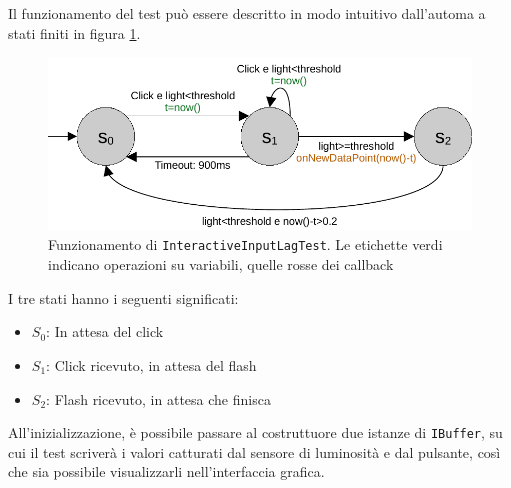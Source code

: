 Il funzionamento del test può essere descritto in modo intuitivo dall'automa a stati finiti in figura \ref{fig:interactiveInputLagTest_fsm}.

\begin{figure}[H]
	\centering
	\includegraphics[width=.8\textwidth]{Applicazione_files/interactiveInputLagTest_fsm.pdf}
	\caption{Funzionamento di \texttt{InteractiveInputLagTest}. Le etichette verdi indicano operazioni su variabili, quelle rosse dei callback}
	\label{fig:interactiveInputLagTest_fsm}
\end{figure}

I tre stati hanno i seguenti significati:\begin{itemize}
	\item \textbf{$S_0$}: In attesa del click
	\item \textbf{$S_1$}: Click ricevuto, in attesa del flash
	\item \textbf{$S_2$}: Flash ricevuto, in attesa che finisca
\end{itemize}

All'inizializzazione, è possibile passare al costruttuore due istanze di \texttt{IBuffer}, su cui il test scriverà i valori catturati dal sensore di luminosità e dal pulsante, così che sia possibile visualizzarli nell'interfaccia grafica.

